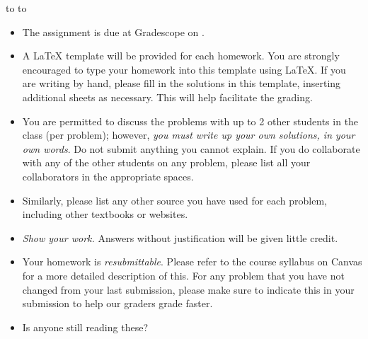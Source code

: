 \documentclass[10pt]{article}
\newcommand{\handout}{
   \renewcommand{\thepage}{H\hnumber-\arabic{page}}
   \noindent
   \begin{center}
      \vbox{
    \hbox to \columnwidth {\sc{\course} --- \prof \hfill}
    \vspace{-2mm}
    \hbox to \columnwidth {\sc due \MakeLowercase{\duedate} \duelocation\hfill {\Huge\color{mdb}H\hnumber.\yourname}}
      }
   \end{center}
   \vspace*{2mm}
}
\begin{document}
\handout
\begin{itemize}
\item The assignment is due at Gradescope on \duedate.

\item A LaTeX template will be provided for each homework. You are strongly encouraged to type your homework into this template using \LaTeX.  If you are writing by hand, please fill in the solutions in this template, inserting additional sheets as necessary. This will help facilitate the grading.

\item You are permitted to discuss the problems with up to 2 other students in the class (per problem); however, {\em you must write up your own solutions, in your own words}. Do not submit anything you cannot explain. If you do collaborate with any of the other students on any problem, please list all your collaborators in the appropriate spaces.

\item Similarly, please list any other source you have used for each problem, including other textbooks or websites.

\item {\em Show your work.} Answers without justification will be given little credit.

\item Your homework is \textit{resubmittable}. Please refer to the course syllabus on Canvas for a more detailed description of this. For any problem that you have not changed from your last submission, please make sure to indicate this in your submission to help our graders grade faster. 

\item Is anyone still reading these?

\end{itemize}


\end{document}
